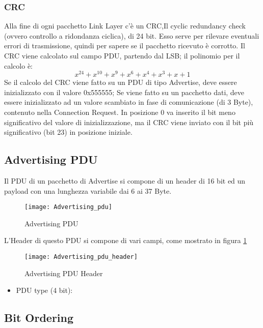 \subsubsection{CRC}
Alla fine di ogni pacchetto Link Layer c'è un CRC,Il cyclic redundancy check (ovvero controllo a ridondanza ciclica), di 24 bit. Esso serve per rilevare eventuali errori di trasmissione, quindi per sapere se il pacchetto ricevuto è corrotto.
Il CRC viene calcolato sul campo PDU, partendo dal LSB; il polinomio per il calcolo è:
\[x^24 + x^10 + x^9 + x^6 + x^4 + x^3 + x + 1\] 
Se il calcolo del CRC viene fatto su un PDU di tipo Advertise, deve essere inizializzato con il valore 0x555555;
Se viene fatto su un pacchetto dati, deve essere inizializzato ad un valore scambiato in fase di comunicazione (di 3 Byte), contenuto nella Connection Request.
In posizione 0 va inserito il bit meno significativo del valore di inizializzazione, ma il CRC viene inviato con il bit più significativo (bit 23) in posizione iniziale.

\subsection{Advertising PDU}
Il PDU di un pacchetto di Advertise si compone di un header di 16 bit ed un payload con una lunghezza variabile dai 6 ai 37 Byte.

\begin{figure}[H]
\texttt{[image: Advertising\_pdu]}
\centering
\caption{Advertising PDU}
\end{figure}

\noindent L'Header di questo PDU si compone di vari campi, come mostrato in figura \ref{Advertising_pdu_header}

\begin{figure}[H]
\texttt{[image: Advertising\_pdu\_header]}
\centering
\caption{Advertising PDU Header}
\label{Advertising_pdu_header}
\end{figure}

\begin{itemize}
\item PDU type (4 bit): 
\end{itemize}




\subsection{Bit Ordering}




